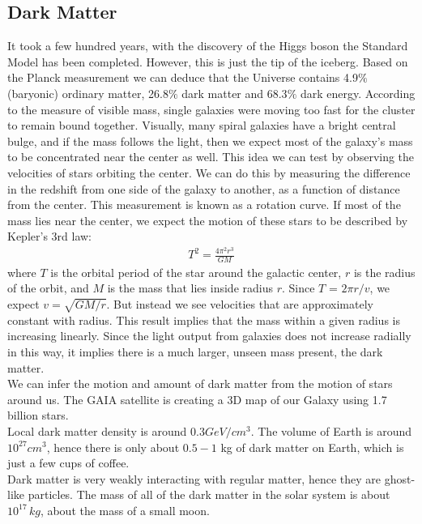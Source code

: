 \documentclass[11pt]{article}
\theoremstyle{break}
\theoremstyle{break}
\begin{document}
\subsection{Dark Matter}
It took a few hundred years, with the discovery of the Higgs boson the Standard Model has been completed. However, this is just the tip of the iceberg. Based on the Planck measurement we can deduce that the Universe contains 4.9$\%$ (baryonic) ordinary matter, 26.8$\%$ dark matter and 68.3$\%$ dark
energy. According to the measure of visible mass, single galaxies were moving too fast for the cluster to remain bound together. Visually, many spiral galaxies have a bright central bulge, and if the mass follows the light, then we expect most of the galaxy's mass to be concentrated near the center as well. This idea we
can test by observing the velocities of stars orbiting the center. We can do this by measuring the difference in the redshift from one side of the galaxy to another, as a function of distance from the center. This measurement is known as a rotation curve. If most of the mass lies near the center, we expect the motion of these stars to be described by Kepler's 3rd law:
\begin{align*}
T^2 = \frac{4\pi^2r^3}{GM}
\end{align*}
where $T$ is the orbital period of the star around the galactic center, $r$ is the radius of the orbit,
and $M$ is the mass that lies inside radius $r$. Since $T$ = $2\pi r/v$, we expect $v=\sqrt{GM/r}$. But instead we see velocities that are approximately constant with radius. This result implies that the mass within a given radius is increasing linearly. Since the light output from galaxies does not increase radially in this way, it implies there is a much larger, unseen mass present, the dark matter.\\

We can infer the motion and amount of dark matter from the motion of stars around us. The GAIA satellite is creating a 3D map of our Galaxy using 1.7 billion stars.\\

Local dark matter density is around $0.3 GeV/cm^3$. The volume of Earth is around $10^{27} cm^3$, hence there is only
about $0.5 - 1$ kg of dark matter on Earth, which is just a few cups of
coffee.\\

Dark matter is very weakly interacting with regular matter, hence they are ghost-like particles. The mass of all of the dark matter in the solar system is about $10^{17}\, kg$, about the mass of a small moon. \\
\end{document}
